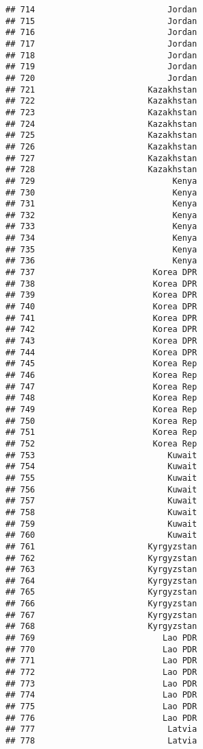 \documentclass[]{article}
\begin{document}
\begin{verbatim}
## 714                           Jordan
## 715                           Jordan
## 716                           Jordan
## 717                           Jordan
## 718                           Jordan
## 719                           Jordan
## 720                           Jordan
## 721                       Kazakhstan
## 722                       Kazakhstan
## 723                       Kazakhstan
## 724                       Kazakhstan
## 725                       Kazakhstan
## 726                       Kazakhstan
## 727                       Kazakhstan
## 728                       Kazakhstan
## 729                            Kenya
## 730                            Kenya
## 731                            Kenya
## 732                            Kenya
## 733                            Kenya
## 734                            Kenya
## 735                            Kenya
## 736                            Kenya
## 737                        Korea DPR
## 738                        Korea DPR
## 739                        Korea DPR
## 740                        Korea DPR
## 741                        Korea DPR
## 742                        Korea DPR
## 743                        Korea DPR
## 744                        Korea DPR
## 745                        Korea Rep
## 746                        Korea Rep
## 747                        Korea Rep
## 748                        Korea Rep
## 749                        Korea Rep
## 750                        Korea Rep
## 751                        Korea Rep
## 752                        Korea Rep
## 753                           Kuwait
## 754                           Kuwait
## 755                           Kuwait
## 756                           Kuwait
## 757                           Kuwait
## 758                           Kuwait
## 759                           Kuwait
## 760                           Kuwait
## 761                       Kyrgyzstan
## 762                       Kyrgyzstan
## 763                       Kyrgyzstan
## 764                       Kyrgyzstan
## 765                       Kyrgyzstan
## 766                       Kyrgyzstan
## 767                       Kyrgyzstan
## 768                       Kyrgyzstan
## 769                          Lao PDR
## 770                          Lao PDR
## 771                          Lao PDR
## 772                          Lao PDR
## 773                          Lao PDR
## 774                          Lao PDR
## 775                          Lao PDR
## 776                          Lao PDR
## 777                           Latvia
## 778                           Latvia

\end{verbatim}
\end{document}
